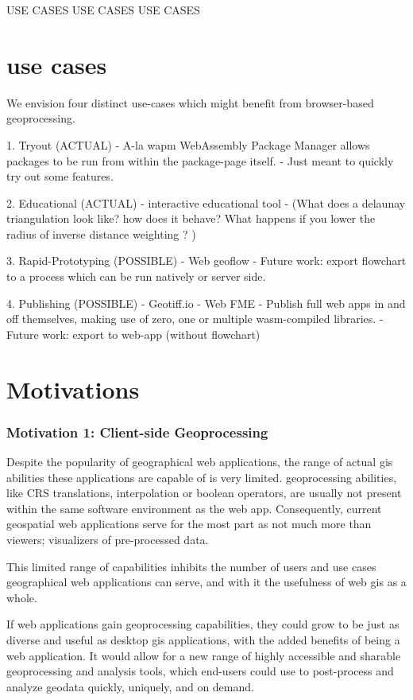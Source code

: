 USE CASES USE CASES USE CASES


\section{use cases}
We envision four distinct use-cases which might benefit from browser-based geoprocessing. 


1. Tryout (ACTUAL)
   - A-la wapm WebAssembly Package Manager allows packages to be run from within the package-page itself. 
  - Just meant to quickly try out some features.

2. Educational (ACTUAL)
   - interactive educational tool
   - (What does a delaunay triangulation look like? how does it behave? What happens if you lower the radius of inverse distance weighting ? )

3. Rapid-Prototyping (POSSIBLE)
   - Web geoflow
   - Future work: export flowchart to a process which can be run natively or server side.

4. Publishing (POSSIBLE)
   - Geotiff.io
   - Web FME 
   - Publish full web apps in and off themselves, making use of zero, one or multiple wasm-compiled libraries.  
   - Future work: export to web-app (without flowchart)




\section{Motivations}

\subsubsection{Motivation 1: Client-side Geoprocessing}

Despite the popularity of geographical web applications, the range of actual \ac{gis} abilities these applications are capable of is very limited. \ac{geoprocessing} abilities, like CRS translations, interpolation or boolean operators, are usually not present within the same software environment as the web app. Consequently, current geospatial web applications serve for the most part as not much more than viewers; visualizers of pre-processed data. 

This limited range of capabilities inhibits the number of users and use cases geographical web applications can serve, and with it the usefulness of web \ac{gis} as a whole. 

If web applications gain \ac{geoprocessing} capabilities, they could grow to be just as diverse and useful as desktop \ac{gis} applications, with the added benefits of being a web application. It would allow for a new range of highly accessible and sharable geoprocessing and analysis tools, which end-users could use to post-process and analyze geodata quickly, uniquely, and on demand.

